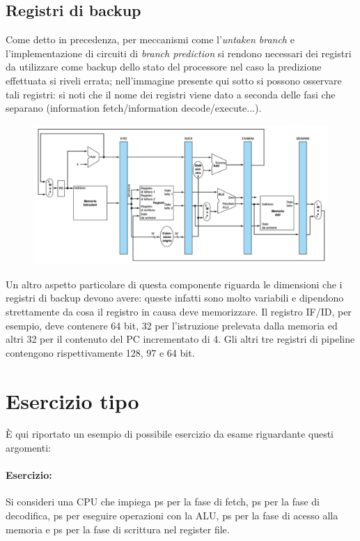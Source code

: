 \documentclass[class=book, crop=false, oneside]{standalone}
\begin{document}
\subsection{Registri di backup}
Come detto in precedenza, per meccanismi come l'\emph{untaken branch} e l'implementazione di circuiti di \emph{branch prediction} si rendono necessari dei registri da utilizzare come backup dello stato del processore nel caso la predizione effettuata si riveli errata; nell'immagine presente qui sotto si possono osservare tali registri: si noti che il nome dei registri viene dato a seconda delle fasi che separano (information fetch/information decode/execute...).
\begin{figure}[H]
	\centering
	\includegraphics[width=\textwidth,keepaspectratio]{registri-di-backup.png}
\end{figure}
Un altro aspetto particolare di questa componente riguarda le dimensioni che i registri di backup devono avere: queste infatti sono molto variabili e dipendono strettamente da cosa il registro in causa deve memorizzare. Il registro IF/ID, per esempio, deve contenere 64 bit, 32 per l’istruzione prelevata dalla memoria ed altri 32 per il contenuto del PC incrementato di 4. Gli altri tre registri di pipeline contengono rispettivamente 128, 97 e 64 bit.

\section{Esercizio tipo}
È qui riportato un esempio di possibile esercizio da esame riguardante questi argomenti:
\paragraph{Esercizio:} Si consideri una CPU che impiega \unit[600]{ps} per la fase di fetch, \unit[600]{ps} per la fase di decodifica, \unit[500]{ps} per eseguire operazioni con la ALU, \unit[400]{ps} per la fase di acesso alla memoria e \unit[700]{ps} per la fase di scrittura nel register file.
\end{document}
